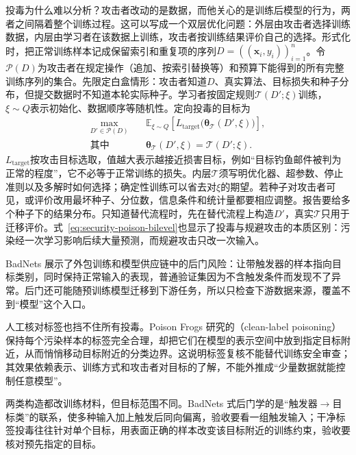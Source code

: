 投毒为什么难以分析？攻击者改动的是数据，而他关心的是训练后模型的行为，两者之间隔着整个训练过程。这可以写成一个双层优化问题：外层由攻击者选择训练数据，内层由学习者在该数据上训练，攻击者按训练结果评价自己的选择。形式化时，把正常训练样本记成保留索引和重复项的序列$D=((\bm{x}_i,y_i))_{i=1}^n$。令$\mathcal P(D)$为攻击者在规定操作（追加、按索引替换等）和预算下能得到的所有完整训练序列的集合。先限定白盒情形：攻击者知道$D$、真实算法、目标损失和种子分布，但提交数据时不知道本轮实际种子。学习者按固定规则$\mathcal T(D';\xi)$训练，$\xi\sim Q$表示初始化、数据顺序等随机性。定向投毒的目标为
\begin{equation}
 \begin{aligned}
 \max_{D'\in\mathcal P(D)}\quad&
 \mathbb E_{\xi\sim Q}
 \left[L_{\mathrm{target}}\bigl(\bm{\theta}_{\mathcal T}
       (D',\xi)\bigr)\right],\\
 \text{其中}\quad&
 \bm{\theta}_{\mathcal T}(D',\xi)
 =\mathcal T(D';\xi).
 \end{aligned}
 \label{eq:security-poison-bilevel}
\end{equation}
$L_{\mathrm{target}}$按攻击目标选取，值越大表示越接近损害目标，例如“目标钓鱼邮件被判为正常的程度”，它不必等于正常训练的损失。内层$\mathcal T$须写明优化器、超参数、停止准则以及多解时如何选择；确定性训练可以省去对$\xi$的期望。若种子对攻击者可见，或评价改用最坏种子、分位数，信息条件和统计量都要相应调整。报告要给多个种子下的结果分布。只知道替代流程时，先在替代流程上构造$D'$，真实$\mathcal T$只用于迁移评价。式~\eqref{eq:security-poison-bilevel}也显示了投毒与规避攻击的本质区别：污染经一次学习影响后续大量预测，而规避攻击只改一次输入。

BadNets 展示了外包训练和模型供应链中的后门风险：让带触发器的样本指向目标类别，同时保持正常输入的表现，普通验证集因为不含触发条件而发现不了异常。后门还可能随预训练模型迁移到下游任务，所以只检查下游数据来源，覆盖不到“模型”这个入口。

人工核对标签也挡不住所有投毒。Poison Frogs 研究的（clean-label poisoning）保持每个污染样本的标签完全合理，却把它们在模型的表示空间中放到指定目标附近，从而悄悄移动目标附近的分类边界。这说明标签复核不能替代训练安全审查；其效果依赖表示、训练方式和攻击者对目标的了解，不能外推成“少量数据就能控制任意模型”。

两类构造都改训练材料，但目标范围不同。BadNets 式后门学的是“触发器$\to$目标类”的联系，使多种输入加上触发后同向偏离，验收要看一组触发输入；干净标签投毒往往针对单个目标，用表面正确的样本改变该目标附近的训练约束，验收要核对预先指定的目标。

